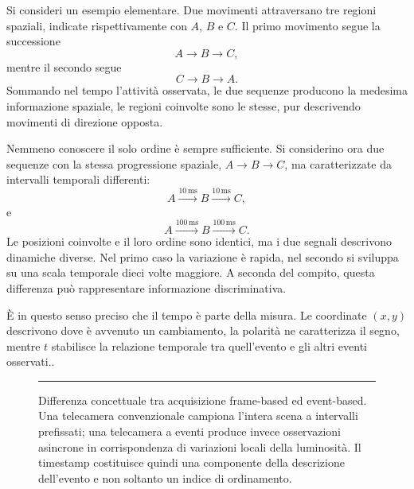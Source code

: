 Si consideri un esempio elementare. Due movimenti attraversano tre regioni spaziali, indicate rispettivamente con $A$, $B$ e $C$. Il primo movimento segue la successione
\begin{equation*}
A \longrightarrow B \longrightarrow C,
\end{equation*}
mentre il secondo segue
\begin{equation*}
C \longrightarrow B \longrightarrow A.
\end{equation*}
Sommando nel tempo l'attività osservata, le due sequenze producono la medesima informazione spaziale, le regioni coinvolte sono le stesse, pur descrivendo movimenti di direzione opposta.

Nemmeno conoscere il solo ordine è sempre sufficiente. Si considerino ora due sequenze con la stessa progressione spaziale, $A \rightarrow B \rightarrow C$, ma caratterizzate da intervalli temporali differenti:
\begin{equation*}
A \xrightarrow{10\,\mathrm{ms}} B \xrightarrow{10\,\mathrm{ms}} C,
\end{equation*}
e
\begin{equation*}
A \xrightarrow{100\,\mathrm{ms}} B \xrightarrow{100\,\mathrm{ms}} C.
\end{equation*}
Le posizioni coinvolte e il loro ordine sono identici, ma i due segnali descrivono dinamiche diverse. Nel primo caso la variazione è rapida, nel secondo si sviluppa su una scala temporale dieci volte maggiore. A seconda del compito, questa differenza può rappresentare informazione discriminativa.

È in questo senso preciso che il tempo è parte della misura. Le coordinate $(x, y)$ descrivono dove è avvenuto un cambiamento, la polarità ne caratterizza il segno, mentre $t$ stabilisce la relazione temporale tra quell'evento e gli altri eventi osservati..

\begin{figure}[htbp]
    \centering
    \rule{0.9\textwidth}{5cm} %
    \caption{Differenza concettuale tra acquisizione frame-based ed event-based. Una telecamera convenzionale campiona l'intera scena a intervalli prefissati; una telecamera a eventi produce invece osservazioni asincrone in corrispondenza di variazioni locali della luminosità. Il timestamp costituisce quindi una componente della descrizione dell'evento e non soltanto un indice di ordinamento.}
    \label{fig:frame_vs_event_sampling}
\end{figure}

